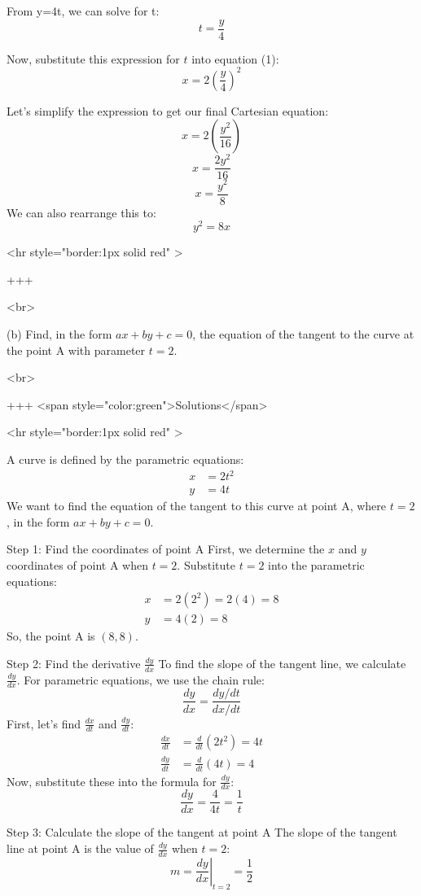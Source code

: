 From y=4t, we can solve for t:
$$
t = \frac{y}{4}
$$

Now, substitute this expression for $t$ into equation (1):
$$
x = 2\left(\frac{y}{4}\right)^2
$$

Let's simplify the expression to get our final Cartesian equation:
$$
x = 2\left(\frac{y^2}{16}\right)
$$
$$
x = \frac{2y^2}{16}
$$
$$
x = \frac{y^2}{8}
$$
We can also rearrange this to:
$$
y^2 = 8x
$$

<hr style="border:1px solid red" >

+++

<br>

(b) Find, in the form $a x+b y+c=0$, the equation of the tangent to the curve at the point A with parameter $t=2$.

<br>

+++ <span style="color:green">Solutions</span>

<hr style="border:1px solid red" >

A curve is defined by the parametric equations:
\begin{align*} x &= 2t^2 \\ y &= 4t \end{align*}
We want to find the equation of the tangent to this curve at point A, where $t=2$, in the form $ax+by+c=0$.

Step 1: Find the coordinates of point A
First, we determine the $x$ and $y$ coordinates of point A when $t=2$.
Substitute $t=2$ into the parametric equations:
\begin{align*} x &= 2(2^2) = 2(4) = 8 \\ y &= 4(2) = 8 \end{align*}
So, the point A is $(8, 8)$.

Step 2: Find the derivative $\frac{dy}{dx}$
To find the slope of the tangent line, we calculate $\frac{dy}{dx}$. For parametric equations, we use the chain rule:
$$ \frac{dy}{dx} = \frac{dy/dt}{dx/dt} $$
First, let's find $\frac{dx}{dt}$ and $\frac{dy}{dt}$:
\begin{align*} \frac{dx}{dt} &= \frac{d}{dt}(2t^2) = 4t \\ \frac{dy}{dt} &= \frac{d}{dt}(4t) = 4 \end{align*}
Now, substitute these into the formula for $\frac{dy}{dx}$:
$$ \frac{dy}{dx} = \frac{4}{4t} = \frac{1}{t} $$

Step 3: Calculate the slope of the tangent at point A
The slope of the tangent line at point A is the value of $\frac{dy}{dx}$ when $t=2$:
$$ m = \left.\frac{dy}{dx}\right|_{t=2} = \frac{1}{2} $$

